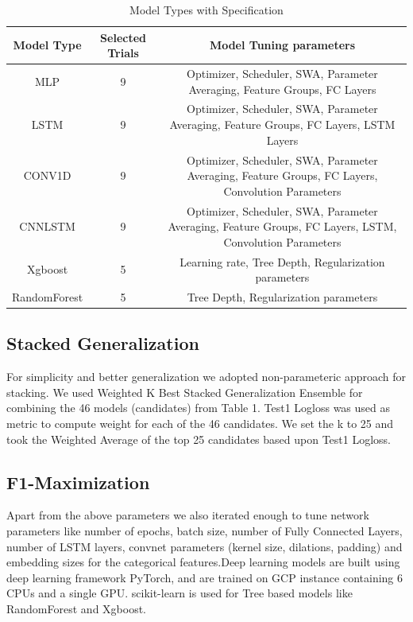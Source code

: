 \begin{table}[t]
\caption{Model Types with Specification}
\vspace{0.1 in}
\centering
\resizebox{6.6in}{!}
{%
\begin{tabular}{c|c|c}
\hline
{\bf Model Type} & {\bf Selected Trials} & {\bf Model Tuning parameters} \\  \hline
MLP	  		&  9 & Optimizer, Scheduler, SWA, Parameter Averaging, Feature Groups, FC Layers \\ \hline
LSTM  		& 9 & Optimizer, Scheduler, SWA, Parameter Averaging, Feature Groups, FC Layers, LSTM Layers  \\ \hline
CONV1D			& 9	& Optimizer, Scheduler, SWA, Parameter Averaging, Feature Groups, FC Layers, Convolution Parameters  \\ \hline
CNNLSTM 		& 9	& Optimizer, Scheduler, SWA, Parameter Averaging, Feature Groups, FC Layers, LSTM, Convolution Parameters  \\ \hline
Xgboost 		& 5	& Learning rate, Tree Depth, Regularization parameters  \\ \hline
RandomForest 		& 5	& Tree Depth, Regularization parameters \\ \hline
\end{tabular}
}
\label{tab:accuracy}
\end{table}

\subsection{Stacked Generalization}
For simplicity and better generalization we adopted non-parameteric approach for stacking.
We used Weighted K Best Stacked Generalization Ensemble for combining the 46 models (candidates) from Table 1. 
Test1 Logloss was used as metric to compute weight for each of the 46 candidates. We set the k to 25 and 
took the Weighted Average of the top 25 candidates based upon Test1 Logloss.

\subsection{F1-Maximization}
Apart from the above parameters we also iterated enough to tune network parameters like number of epochs, batch size, 
number of Fully Connected Layers, number of LSTM layers, convnet parameters (kernel size, dilations, padding)
and embedding sizes for the categorical features.Deep learning models are built using deep learning framework
PyTorch, and are trained on GCP instance containing 6 CPUs and a single GPU. scikit-learn is used for Tree
based models like RandomForest and Xgboost.
